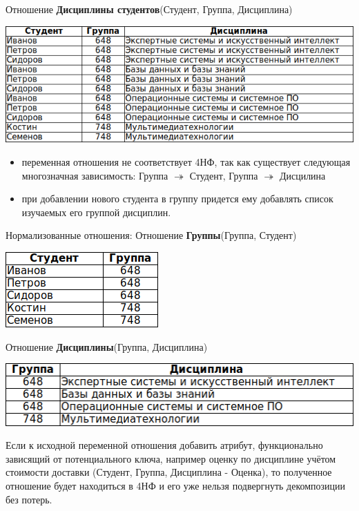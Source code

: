 \documentclass{beamer}
\begin{document}
\begin{frame}
Отношение \textbf{Дисциплины студентов}(Студент, Группа, Дисциплина)
\begin{center}
\includegraphics[scale=1]{images/ex-rasp-11.png}
\end{center}
\begin{itemize}
\item переменная отношения не соответствует 4НФ, так как существует следующая многозначная зависимость: Группа $\twoheadrightarrow$ Студент, Группа $\twoheadrightarrow$ Дисцилина
\item при добавлении нового студента в группу придется ему добавлять список изучаемых его группой дисциплин.
\end{itemize}
Нормализованные отношения:
Отношение \textbf{Группы}(Группа, Студент)
\begin{center}
\includegraphics[scale=1]{images/ex-rasp-12.png}
\end{center}
Отношение \textbf{Дисциплины}(Группа, Дисциплина)
\begin{center}
\includegraphics[scale=1]{images/ex-rasp-13.png}
\end{center}
Если к исходной переменной отношения добавить атрибут, функционально зависящий от потенциального ключа, например оценку по дисциплине  учётом стоимости доставки (Студент, Группа, Дисциплина - Оценка), то полученное отношение будет находиться в 4НФ и его уже нельзя подвергнуть декомпозиции без потерь.
\end{frame}
\end{document}
